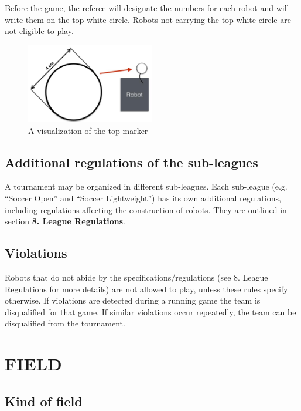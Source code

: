 \documentclass{article}
\begin{document}
Before the game, the referee will designate the numbers for each robot and will
write them on the top white circle. Robots not carrying the top white circle
are not eligible to play.

\begin{figure}[H]
    \centering
    \includegraphics[width=0.5\textwidth]{media/image4.jpeg}
    \caption{A visualization of the top marker}
    \label{fig:top_marker}
\end{figure}

\subsection{ Additional regulations of the sub-leagues \label{ref-sub-leagues}}

A tournament may be organized in different sub-leagues. Each sub-league (e.g.
``Soccer Open'' and ``Soccer Lightweight'') has its own additional regulations,
including regulations affecting the construction of robots. They are outlined
in section \textbf{8. League Regulations}.

\subsection{ Violations \label{ref-027}}

Robots that do not abide by the specifications/regulations (see 8. League
Regulations for more details) are not allowed to play, unless these rules
specify otherwise. If violations are detected during a running game the team is
disqualified for that game. If similar violations occur repeatedly, the team
can be disqualified from the tournament.

\section{FIELD \label{ref-028}}

\subsection{Kind of field \label{ref-029}}
\end{document}
